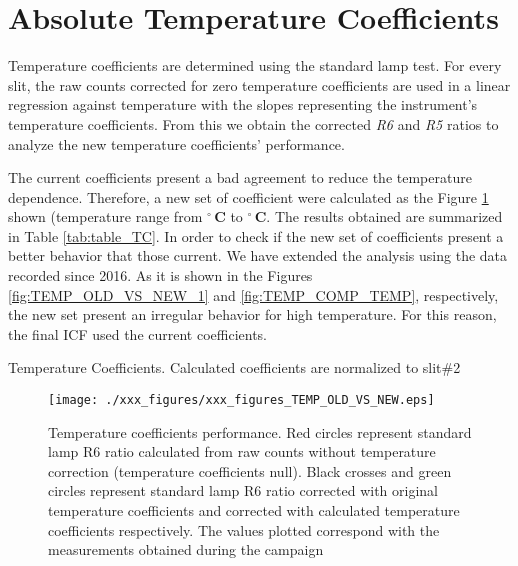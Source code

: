 

\section{Absolute Temperature Coefficients} \label{sec:TC}


Temperature coefficients are determined using the standard lamp test.
For every slit, the raw counts corrected for zero temperature coefficients are used in a linear regression against temperature  with the slopes representing the instrument's temperature coefficients. From this we obtain the corrected \emph{R6} and \emph{R5} ratios to analyze the new temperature coefficients' performance.

The current coefficients present a bad agreement to reduce the temperature dependence. Therefore, a new set of coefficient were calculated as the Figure \ref{fig:TEMP_OLD_VS_NEW} shown (temperature range from \textbf{\tempmin$^\circ$\,C} to \textbf{\tempmax$^\circ$\,C}. The results obtained are summarized in Table \ref{tab:table_TC}. 
In order to check if the new set of coefficients present a better behavior that those current. We have extended the analysis using the data recorded since 2016. As it is shown in the Figures \ref{fig:TEMP_OLD_VS_NEW_1} and \ref {fig:TEMP_COMP_TEMP}, respectively, the new set present an irregular behavior for high temperature. For this reason, the final ICF used the current coefficients.


\begin{table}[b!] \centering
	\caption{Temperature Coefficients. Calculated coefficients are normalized to slit\#2}
	\label{tab:table_TC}
	
\end{table}


\begin{figure}[htbp!]
\begin{center}   
     \texttt{[image: ./xxx\_figures/xxx\_figures\_TEMP\_OLD\_VS\_NEW.eps]}
     \caption{Temperature coefficients performance. Red circles represent standard lamp R6 ratio calculated from raw counts without temperature correction (temperature coefficients null). Black crosses and green circles represent standard lamp R6 ratio corrected with original temperature coefficients and corrected with calculated temperature coefficients respectively. The values plotted correspond with the measurements obtained during the campaign}
	   \label{fig:TEMP_OLD_VS_NEW}
\end{center}
\end{figure}


